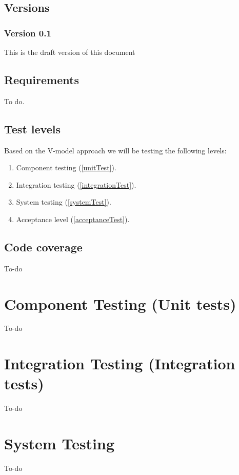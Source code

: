 \documentclass[signature]{deltares_report}
\begin{document}
\section{Versions}
\label{sec:Versions}

\subsection{Version 0.1}
\label{sec:Version}
This is the draft version of this document

\section{Requirements}
\label{sec:requirements}
To do.


\section{Test levels}
\label{sec:testLevels}
Based on the V-model approach we will be testing the following levels:
\begin{enumerate}
\item Component testing (\autoref{unitTest}).
\item Integration testing (\autoref{integrationTest}).
\item System testing (\autoref{systemTest}).
\item Acceptance level (\autoref{acceptanceTest}).
\end{enumerate}

\section{Code coverage}
\label{sec:codeCoverage}
To-do
\chapter{Component Testing (Unit tests)}
\label{unitTest}
To-do

\chapter{Integration Testing (Integration tests)}
\label{integrationTest}
To-do

\chapter{System Testing}
\label{systemTest}
To-do
\end{document}
